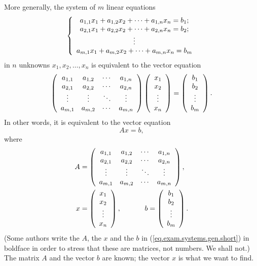 \documentclass[numbers=enddot,12pt,final,onecolumn,notitlepage]{scrartcl}%
\theoremstyle{definition}
\begin{document}
More generally, the system of $m$ linear equations
\[
\left\{
\begin{array}
[c]{c}%
a_{1,1}x_{1}+a_{1,2}x_{2}+\cdots+a_{1,n}x_{n}=b_{1};\\
a_{2,1}x_{1}+a_{2,2}x_{2}+\cdots+a_{2,n}x_{n}=b_{2};\\
\vdots\\
a_{m,1}x_{1}+a_{m,2}x_{2}+\cdots+a_{m,n}x_{n}=b_{m}%
\end{array}
\right.
\]
in $n$ unknowns $x_{1},x_{2},\ldots,x_{n}$ is equivalent to the vector
equation%
\begin{equation}
\left(
\begin{array}
[c]{cccc}%
a_{1,1} & a_{1,2} & \cdots & a_{1,n}\\
a_{2,1} & a_{2,2} & \cdots & a_{2,n}\\
\vdots & \vdots & \ddots & \vdots\\
a_{m,1} & a_{m,2} & \cdots & a_{m,n}%
\end{array}
\right)  \left(
\begin{array}
[c]{c}%
x_{1}\\
x_{2}\\
\vdots\\
x_{n}%
\end{array}
\right)  =\left(
\begin{array}
[c]{c}%
b_{1}\\
b_{2}\\
\vdots\\
b_{m}%
\end{array}
\right)  . \label{eq.exam.systems.gen}%
\end{equation}
In other words, it is equivalent to the vector equation%
\begin{equation}
Ax=b, \label{eq.exam.systems.gen.short}%
\end{equation}
where%
\begin{align*}
A  &  =\left(
\begin{array}
[c]{cccc}%
a_{1,1} & a_{1,2} & \cdots & a_{1,n}\\
a_{2,1} & a_{2,2} & \cdots & a_{2,n}\\
\vdots & \vdots & \ddots & \vdots\\
a_{m,1} & a_{m,2} & \cdots & a_{m,n}%
\end{array}
\right)  ,\\
x  &  =\left(
\begin{array}
[c]{c}%
x_{1}\\
x_{2}\\
\vdots\\
x_{n}%
\end{array}
\right)  ,\ \ \ \ \ \ \ \ \ \ b=\left(
\begin{array}
[c]{c}%
b_{1}\\
b_{2}\\
\vdots\\
b_{m}%
\end{array}
\right)  .
\end{align*}
(Some authors write the $A$, the $x$ and the $b$ in
(\ref{eq.exam.systems.gen.short}) in boldface in order to stress that these
are matrices, not numbers. We shall not.) The matrix $A$ and the vector $b$
are known; the vector $x$ is what we want to find.
\end{document}

